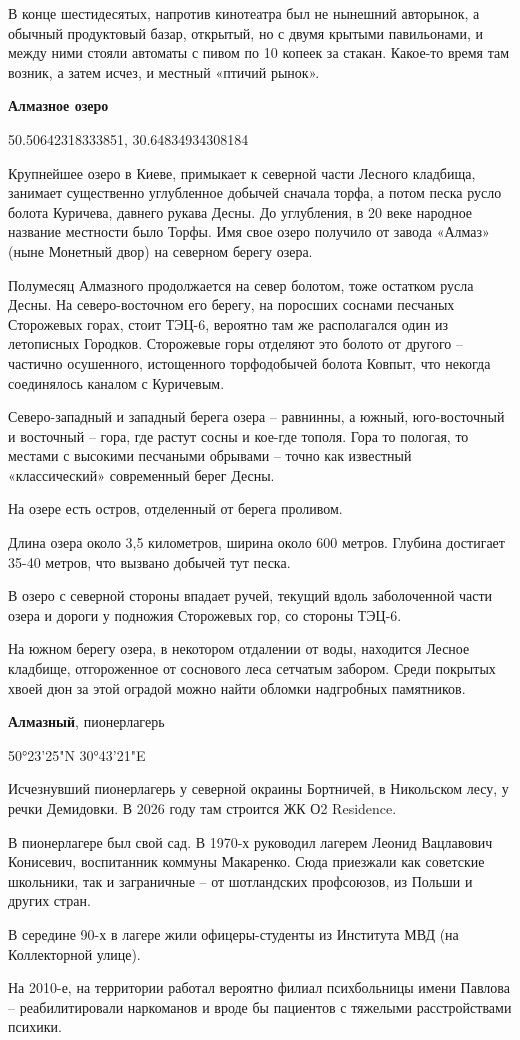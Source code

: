 В конце шестидесятых, напротив кинотеатра был не нынешний авторынок, а обычный продуктовый базар, открытый, но с двумя крытыми павильонами, и между ними стояли автоматы с пивом по 10 копеек за стакан. Какое-то время там возник, а затем исчез, и местный «птичий рынок».\\

\medskip

\textbf{Алмазное озеро}

50.50642318333851, 30.64834934308184

Крупнейшее озеро в Киеве, примыкает к северной части Лесного кладбища, занимает существенно углубленное добычей сначала торфа, а потом песка русло болота Куричева, давнего рукава Десны. До углубления, в 20 веке народное название местности было Торфы. Имя свое озеро получило от завода «Алмаз» (ныне Монетный двор) на северном берегу озера.

Полумесяц Алмазного продолжается на север болотом, тоже остатком русла Десны. На северо-восточном его берегу, на поросших соснами песчаных Сторожевых горах, стоит ТЭЦ-6, вероятно там же располагался один из летописных Городков. Сторожевые горы отделяют это болото от другого – частично осушенного, истощенного торфодобычей болота Ковпыт, что некогда соединялось каналом с Куричевым.

Северо-западный и западный берега озера – равнинны, а южный, юго-восточный и восточный – гора, где растут сосны и кое-где тополя. Гора то пологая, то местами с высокими песчаными обрывами – точно как известный «классический» современный берег Десны. 

На озере есть остров, отделенный от берега проливом.

Длина озера около 3,5 километров, ширина около 600 метров. Глубина достигает 35-40 метров, что вызвано добычей тут песка.

В озеро с северной стороны впадает ручей, текущий вдоль заболоченной части озера и дороги у подножия Сторожевых гор, со стороны ТЭЦ-6.

На южном берегу озера, в некотором отдалении от воды, находится Лесное кладбище, отгороженное от соснового леса сетчатым забором. Среди покрытых хвоей дюн за этой оградой можно найти обломки надгробных памятников.\\

\medskip


\textbf{Алмазный}, пионерлагерь

50°23'25"N 30°43'21"E

Исчезнувший пионерлагерь у северной окраины Бортничей, в Никольском лесу, у речки Демидовки. В 2026 году там строится ЖК О2 Residence.

В пионерлагере был свой сад. В 1970-х руководил лагерем Леонид Вацлавович Конисевич, воспитанник коммуны Макаренко. Сюда приезжали как советские школьники, так и заграничные – от шотландских профсоюзов, из Польши и других стран.

В середине 90-х в лагере жили офицеры-студенты из Института МВД (на Коллекторной улице).

На 2010-е, на территории работал вероятно филиал психбольницы имени Павлова – реабилитировали наркоманов и вроде бы пациентов с тяжелыми расстройствами психики.
